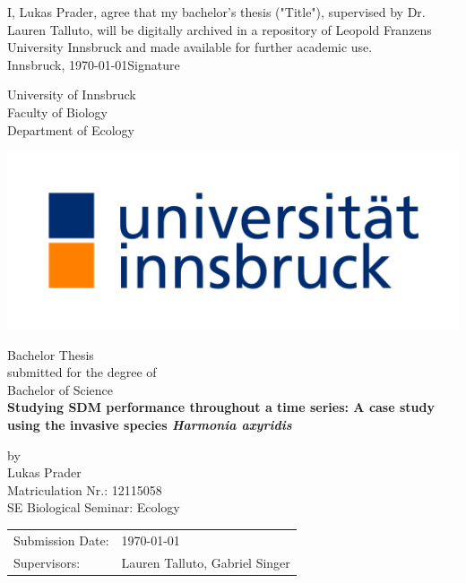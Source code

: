 \documentclass[12pt,a4paper]{article}
\begin{document}
\def\findate{\today}


\thispagestyle{empty}
I, Lukas Prader, agree that my bachelor's thesis ("Title"), supervised by Dr. Lauren Talluto, will be digitally archived in a repository of Leopold Franzens University Innsbruck and made available for further academic use. \\

Innsbruck, \findate					\hfill Signature

\newpage
\thispagestyle{empty}
\begin{center}
    \Large{University of Innsbruck \\ Faculty of Biology} \\
    \vspace{3mm}
    \large{Department of Ecology}
    \vspace{10mm}

    \includegraphics[width = 0.6 \linewidth]{universitaet-innsbruck-logo-cmyk-farbe.jpg}

    \vspace{10mm}
    \Large{Bachelor Thesis} \\
    \large{submitted for the degree of} \\
    \Large{Bachelor of Science} \\
    \vspace{10mm}
    \LARGE{\textbf{Studying SDM performance throughout a time series: A case study using the invasive species \textit{Harmonia axyridis}}} \\
    \vspace{10mm}

    \large{by \\ Lukas Prader \\ Matriculation Nr.: 12115058 \\ SE Biological Seminar: Ecology}
\end{center}

\vspace{30mm}
\begin{tabular}{ll}
    \large{Submission Date:} & \large{\findate}                       \\
    \large{Supervisors:}     & \large{Lauren Talluto, Gabriel Singer} \\
\end{tabular}
\end{document}
